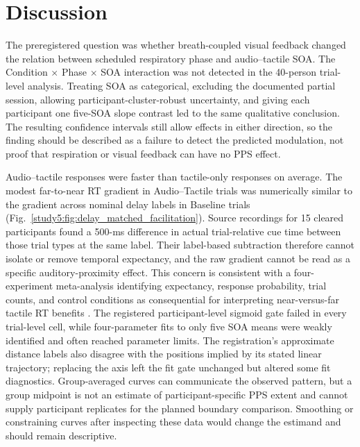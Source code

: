 \section{Discussion}

The preregistered question was whether breath-coupled visual feedback changed the relation between scheduled respiratory phase and audio--tactile SOA. The Condition $\times$ Phase $\times$ SOA interaction was not detected in the 40-person trial-level analysis. Treating SOA as categorical, excluding the documented partial session, allowing participant-cluster-robust uncertainty, and giving each participant one five-SOA slope contrast led to the same qualitative conclusion. The resulting confidence intervals still allow effects in either direction, so the finding should be described as a failure to detect the predicted modulation, not proof that respiration or visual feedback can have no PPS effect.

Audio--tactile responses were faster than tactile-only responses on average. The modest far-to-near RT gradient in Audio--Tactile trials was numerically similar to the gradient across nominal delay labels in Baseline trials (Fig.~\ref{study5:fig:delay_matched_facilitation}). Source recordings for 15 cleared participants found a 500-ms difference in actual trial-relative cue time between those trial types at the same label. Their label-based subtraction therefore cannot isolate or remove temporal expectancy, and the raw gradient cannot be read as a specific auditory-proximity effect. This concern is consistent with a four-experiment meta-analysis identifying expectancy, response probability, trial counts, and control conditions as consequential for interpreting near-versus-far tactile RT benefits \citep{holmes2020sounds}. The registered participant-level sigmoid gate failed in every trial-level cell, while four-parameter fits to only five SOA means were weakly identified and often reached parameter limits. The registration's approximate distance labels also disagree with the positions implied by its stated linear trajectory; replacing the axis left the fit gate unchanged but altered some fit diagnostics. Group-averaged curves can communicate the observed pattern, but a group midpoint is not an estimate of participant-specific PPS extent and cannot supply participant replicates for the planned boundary comparison. Smoothing or constraining curves after inspecting these data would change the estimand and should remain descriptive.

